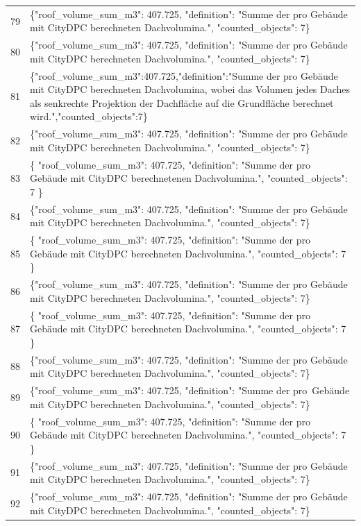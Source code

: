 \documentclass[a4paper,11pt]{article}
\begin{document}
\begin{table}[ht]
\begin{tabular}{r p{12cm}}
79 & \{"roof\_volume\_sum\_m3": 407.725, "definition": "Summe der pro Gebäude mit CityDPC berechneten Dachvolumina.", "counted\_objects": 7\} \\
80 & \{"roof\_volume\_sum\_m3": 407.725, "definition": "Summe der pro Gebäude mit CityDPC berechneten Dachvolumina.", "counted\_objects": 7\} \\
81 & \{"roof\_volume\_sum\_m3":407.725,"definition":"Summe der pro Gebäude mit CityDPC berechneten Dachvolumina, wobei das Volumen jedes Daches als senkrechte Projektion der Dachfläche auf die Grundfläche berechnet wird.","counted\_objects":7\} \\
82 & \{"roof\_volume\_sum\_m3": 407.725, "definition": "Summe der pro Gebäude mit CityDPC berechneten Dachvolumina.", "counted\_objects": 7\} \\
83 & \{
  "roof\_volume\_sum\_m3": 407.725,
  "definition": "Summe der pro Gebäude mit CityDPC berechnetenen Dachvolumina.",
  "counted\_objects": 7
\} \\
84 & \{"roof\_volume\_sum\_m3": 407.725, "definition": "Summe der pro Gebäude mit CityDPC berechneten Dachvolumina.", "counted\_objects": 7\} \\
85 & \{
  "roof\_volume\_sum\_m3": 407.725,
  "definition": "Summe der pro Gebäude mit CityDPC berechneten Dachvolumina.",
  "counted\_objects": 7
\} \\
86 & \{"roof\_volume\_sum\_m3": 407.725, "definition": "Summe der pro Gebäude mit CityDPC berechneten Dachvolumina.", "counted\_objects": 7\} \\
87 & \{
  "roof\_volume\_sum\_m3": 407.725,
  "definition": "Summe der pro Gebäude mit CityDPC berechneten Dachvolumina.",
  "counted\_objects": 7
\} \\
88 & \{"roof\_volume\_sum\_m3": 407.725, "definition": "Summe der pro Gebäude mit CityDPC berechneten Dachvolumina.", "counted\_objects": 7\} \\
89 & \{"roof\_volume\_sum\_m3": 407.725, "definition": "Summe der pro Gebäude mit CityDPC berechneten Dachvolumina.", "counted\_objects": 7\} \\
90 & \{
  "roof\_volume\_sum\_m3": 407.725,
  "definition": "Summe der pro Gebäude mit CityDPC berechneten Dachvolumina.",
  "counted\_objects": 7
\} \\
91 & \{"roof\_volume\_sum\_m3": 407.725, "definition": "Summe der pro Gebäude mit CityDPC berechneten Dachvolumina.", "counted\_objects": 7\} \\
92 & \{"roof\_volume\_sum\_m3": 407.725, "definition": "Summe der pro Gebäude mit CityDPC berechneten Dachvolumina.", "counted\_objects": 7\} \\

\end{tabular}
\end{table}
\end{document}

